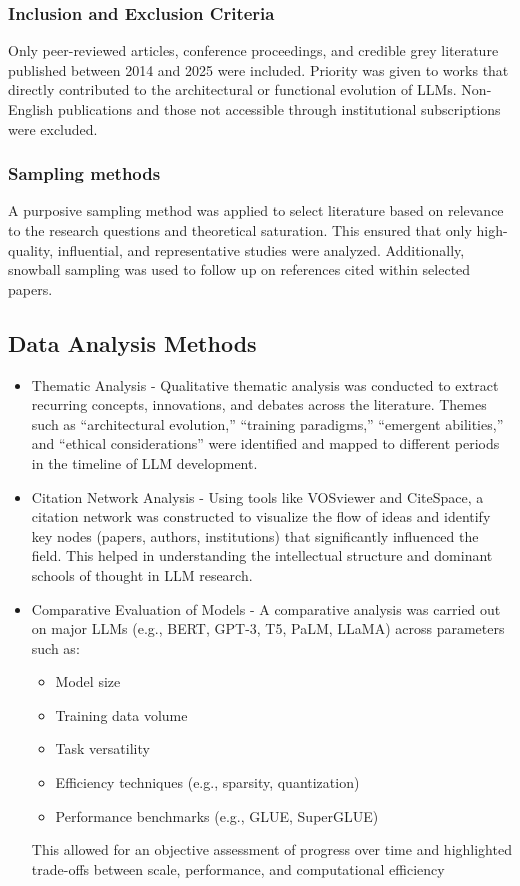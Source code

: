 \documentclass[conference]{IEEEtran}
\begin{document}
\subsubsection{Inclusion and Exclusion Criteria}
Only peer-reviewed articles, conference proceedings, and credible grey literature published between 2014 and 2025 were included. Priority was given to works that directly contributed to the architectural or functional evolution of LLMs. Non-English publications and those not accessible through institutional subscriptions were excluded.
\subsubsection{Sampling methods}
A purposive sampling method was applied to select literature based on relevance to the research questions and theoretical saturation. This ensured that only high-quality, influential, and representative studies were analyzed. Additionally, snowball sampling was used to follow up on references cited within selected papers.

\subsection{Data Analysis Methods}
\begin{itemize}
    \item Thematic Analysis - Qualitative thematic analysis was conducted to extract recurring concepts, innovations, and debates across the literature. Themes such as “architectural evolution,” “training paradigms,” “emergent abilities,” and “ethical considerations” were identified and mapped to different periods in the timeline of LLM development.
    \item Citation Network Analysis - Using tools like VOSviewer and CiteSpace, a citation network was constructed to visualize the flow of ideas and identify key nodes (papers, authors, institutions) that significantly influenced the field. This helped in understanding the intellectual structure and dominant schools of thought in LLM research.
    \item Comparative Evaluation of Models - A comparative analysis was carried out on major LLMs (e.g., BERT, GPT-3, T5, PaLM, LLaMA) across parameters such as: 
    \begin{itemize}
        \item Model size
        \item Training data volume
        \item Task versatility
        \item Efficiency techniques (e.g., sparsity, quantization)
        \item Performance benchmarks (e.g., GLUE, SuperGLUE)      
    \end{itemize}
    This allowed for an objective assessment of progress over time and highlighted trade-offs between scale, performance, and computational efficiency
\end{itemize}
\end{document}
